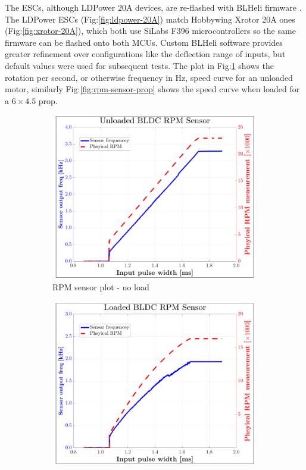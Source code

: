 \par
The ESCs, although LDPower 20A devices, are re-flashed with BLHeli firmware \cite{BLHeli}. The LDPower ESCs (Fig:\ref{fig:ldpower-20A}) match Hobbywing Xrotor 20A ones (Fig:\ref{fig:xrotor-20A}), which both use SiLabs F396 microcontrollers so the same firmware can be flashed onto both MCUs. Custom BLHeli software provides greater refinement over configurations like the deflection range of inputs, but default values were used for subsequent tests. The plot in Fig:\ref{fig:rpm-sensor-noload} shows the rotation per second, or otherwise frequency in Hz, speed curve for an unloaded motor, similarly Fig:\ref{fig:rpm-sensor-prop} shows the speed curve when loaded for a $6\times 4.5$ prop. 
\begin{figure}[htbp]
\begin{subfigure}{0.5\textwidth}
\centering
\includegraphics[width=\textwidth]{graphs/rpm-sensor-noload}
\caption{RPM sensor plot - no load}
\label{fig:rpm-sensor-noload}
\end{subfigure}
\begin{subfigure}{0.5\textwidth}
\centering
\includegraphics[width=\textwidth]{graphs/rpm-sensor-prop}

\end{subfigure}
\end{figure}
